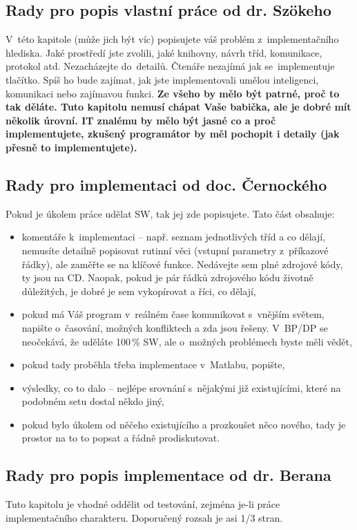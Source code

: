 \subsection*{Rady pro popis vlastní práce od dr. Szökeho}
V~této kapitole (může jich být víc) popisujete váš problém z~implementačního hlediska. Jaké prostředí jste zvolili, jaké knihovny, návrh tříd, komunikace, protokol atd. Nezacházejte do~detailů. Čtenáře nezajímá jak se~implementuje tlačítko. Spíš ho bude zajímat, jak jste implementovali umělou inteligenci, komunikaci nebo zajímavou funkci. \bf Ze všeho by mělo být patrné, proč to tak děláte. \rm  Tuto kapitolu nemusí chápat Vaše babička, ale je dobré mít několik úrovní. IT znalému by mělo být jasné co a proč implementujete, zkušený programátor by měl pochopit i detaily (jak přesně to implementujete).

\subsection*{Rady pro implementaci od doc. Černockého}

Pokud je úkolem práce udělat  SW, tak jej zde popisujete. Tato část obsahuje:
\begin{itemize}
  \item{komentáře k~implementaci -- např. seznam jednotlivých tříd a co dělají, nemusíte detailně popisovat rutinní věci (vstupní parametry z~příkazové řádky), ale zaměřte se na klíčové funkce. Nedávejte sem plné zdrojové kódy, ty jsou na CD. Naopak, pokud je pár řádků zdrojového kódu životně důležitých, je dobré je sem vykopírovat a říci, co dělají,}
  \item{pokud má Váš program v~reálném čase komunikovat s~vnějším světem, napište o~časování, možných konfliktech a zda jsou řešeny. V~BP/DP se neočekává, že uděláte 100\,\%  SW, ale o~možných problémech byste měli vědět,}
  \item{pokud tady proběhla třeba implementace v~Matlabu, popište,}
  \item{výsledky, co to dalo -- nejlépe srovnání s~nějakými již existujícími, které na podobném setu dostal někdo jiný,}
  \item{pokud bylo úkolem  od něčeho existujícího a prozkoušet něco nového, tady je prostor na to to popsat a řádně prodiskutovat.}
\end{itemize}

\subsection*{Rady pro popis implementace od dr. Berana}
Tuto kapitolu je vhodné oddělit od testování, zejména je-li práce implementačního charakteru. Doporučený rozsah je asi 1/3 stran.

